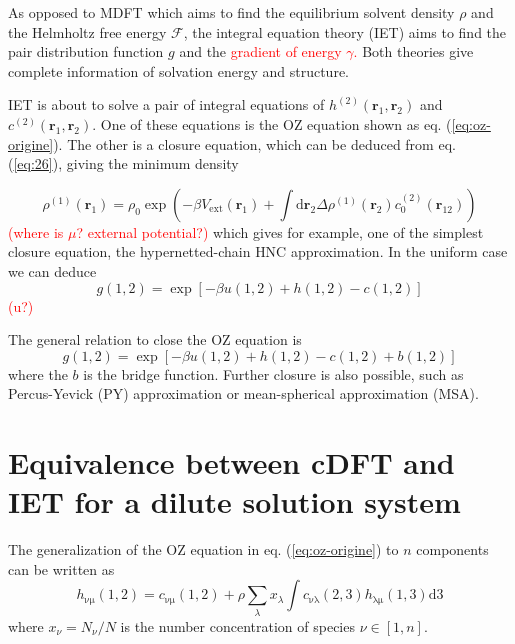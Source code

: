 As opposed to \acs{MDFT} which aims to find the equilibrium solvent
density $\rho$ and the Helmholtz free energy $\mathcal{F}$, the
integral equation theory (\acs{IET}) aims to find the pair distribution
function $g$ and the \textcolor{red}{gradient of energy $\gamma$.}
Both theories give complete information of solvation energy and structure.

\acs{IET} is about to solve a pair of integral equations of $h^{(2)}(\mathbf{r}_{1},\mathbf{r}_{2})$
and $c^{(2)}(\mathbf{r}_{1},\mathbf{r}_{2})$. One of these equations
is the \acs{OZ} equation shown as eq. (\ref{eq:oz-origine}). The
other is a closure equation, which can be deduced from eq. (\ref{eq:26}),
giving the minimum density 

\begin{equation}
\rho^{(1)}(\mathbf{r}_{1})=\rho_{0}\exp\left(-\beta V_{\mathrm{ext}}(\mathbf{r}_{1})+\int\mathrm{d}\mathbf{\mathbf{r}}_{2}\Delta\rho^{(1)}(\mathbf{r}_{2})c_{0}^{(2)}(\mathbf{r}_{12})\right)\label{eq:minimize-anal}
\end{equation}
\textcolor{red}{(where is $\mu$? external potential?)} which gives
for example, one of the simplest closure equation, the hypernetted-chain
\acs{HNC} approximation. In the uniform case we can deduce
\begin{equation}
g(1,2)=\exp\left[-\beta u(1,2)+h(1,2)-c(1,2)\right]
\end{equation}
\textcolor{red}{(u?) }

The general relation to close the OZ equation is
\begin{equation}
g(1,2)=\exp\left[-\beta u(1,2)+h(1,2)-c(1,2)+b(1,2)\right]
\end{equation}
where the $b$ is the bridge function. Further closure is also possible,
such as Percus-Yevick (PY) approximation or mean-spherical approximation
(MSA).

\section{Equivalence between c\acs{DFT} and \acs{IET} for a dilute solution
system}

The generalization of the \acs{OZ} equation in eq. (\ref{eq:oz-origine})
to $n$ components can be written as
\begin{equation}
h_{\mathrm{\nu\mu}}(1,2)=c_{\mathrm{\nu\mu}}(1,2)+\rho\sum_{\lambda}x_{\lambda}\int c_{\mathrm{\nu\lambda}}(2,3)h_{\mathrm{\lambda\mu}}(1,3)\mathrm{d}3
\end{equation}
where $x_{\nu}=N_{\nu}/N$ is the number concentration of species
$\nu\in\left[1,n\right]$.

